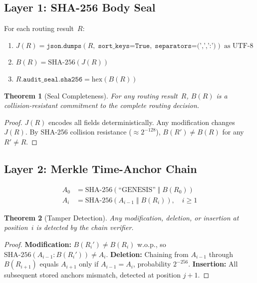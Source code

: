\documentclass[11pt,a4paper]{article}
\newtheorem{theorem}{Theorem}[section]
\begin{document}
\subsection{Layer 1: SHA-256 Body Seal}

For each routing result~$R$:
\begin{enumerate}
  \item $J(R) = \texttt{json.dumps}(R,\;\texttt{sort\_keys=True},\;
        \texttt{separators=(',',':')})\;\text{as UTF-8}$
  \item $B(R) = \text{SHA-256}(J(R))$
  \item $R.\texttt{audit\_seal.sha256} = \mathrm{hex}(B(R))$
\end{enumerate}

\begin{theorem}[Seal Completeness]
For any routing result~$R$, $B(R)$ is a collision-resistant commitment to the
complete routing decision.
\end{theorem}
\begin{proof}
$J(R)$ encodes all fields deterministically. Any modification changes $J(R)$.
By SHA-256 collision resistance ($\approx 2^{-128}$), $B(R') \neq B(R)$ for any
$R' \neq R$.
\end{proof}

\subsection{Layer 2: Merkle Time-Anchor Chain}

\begin{align}
  A_0 &= \text{SHA-256}(\text{``GENESIS''} \;\Vert\; B(R_0)) \label{eq:genesis}\\
  A_i &= \text{SHA-256}(A_{i-1} \;\Vert\; B(R_i)), \quad i \geq 1 \label{eq:chain}
\end{align}

\begin{theorem}[Tamper Detection]
Any modification, deletion, or insertion at position~$i$ is detected by the
chain verifier.
\end{theorem}
\begin{proof}
\textbf{Modification:} $B(R_i') \neq B(R_i)$ w.o.p., so
$\text{SHA-256}(A_{i-1}:B(R_i')) \neq A_i$.
\textbf{Deletion:} Chaining from $A_{i-1}$ through $B(R_{i+1})$ equals
$A_{i+1}$ only if $A_{i-1} = A_i$, probability $2^{-256}$.
\textbf{Insertion:} All subsequent stored anchors mismatch, detected at
position $j+1$.
\end{proof}
\end{document}
